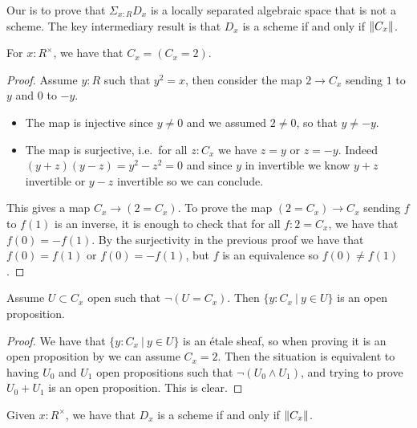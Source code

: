 Our is to prove that $\Sigma_{x:R}D_x$ is a locally separated algebraic space that is not a scheme. The key intermediary result is that $D_x$ is a scheme if and only if $\lVert C_x \rVert$.

\begin{lemma}\label{structure-of-roots}
For $x:R^\times$, we have that $C_x = (C_x = 2)$.
\end{lemma}

\begin{proof}
Assume $y:R$ such that $y^2=x$, then consider the map $2\to C_x$ sending $1$ to $y$ and $0$ to $-y$. 
\begin{itemize}
\item The map is injective since $y\not=0$ and we assumed $2\not=0$, so that $y\not=-y$.
\item The map is surjective, i.e.\ for all $z:C_x$ we have $z=y$ or $z=-y$. Indeed $(y+z)(y-z) = y^2-z^2 = 0$ and since $y$ in invertible we know $y+z$ invertible or $y-z$ invertible so we can conclude.
\end{itemize}
This gives a map $C_x\to (2=C_x)$. To prove the map $(2=C_x)\to C_x$ sending $f$ to $f(1)$ is an inverse, it is enough to check that for all $f:2=C_x$, we have that $f(0) = -f(1)$. By the surjectivity in the previous proof we have that $f(0)=f(1)$ or $f(0)=-f(1)$, but $f$ is an equivalence so $f(0)\not=f(1)$.
\end{proof}

\begin{lemma}\label{open-in-roots-is-constant}
Assume $U\subset C_x$ open such that $\neg (U=C_x)$. Then $\{y:C_x\ |\ y\in U\}$ is an open proposition.
\end{lemma}

\begin{proof}
We have that $\{y:C_x\ |\ y\in U\}$ is an étale sheaf, so when proving it is an open proposition by  we can assume $C_x=2$. Then the situation is equivalent to having $U_0$ and $U_1$ open propositions such that $\neg(U_0\land U_1)$, and trying to prove $U_0+U_1$ is an open proposition. This is clear.
\end{proof}

\begin{proposition}\label{equivalence-root-scheme}
Given $x:R^\times$, we have that $D_x$ is a scheme if and only if $\lVert C_x \rVert$.
\end{proposition}

